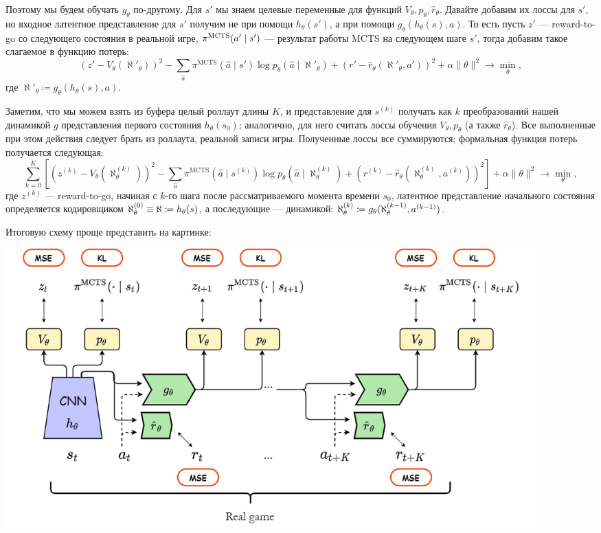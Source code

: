 Поэтому мы будем обучать $g_{\theta}$ по-другому. Для $s'$ мы знаем целевые переменные для функций $V_\theta, p_\theta, \hat{r}_\theta$. Давайте добавим их лоссы для $s'$, но входное латентное представление для $s'$ получим не при помощи $h_{\theta}(s')$, а при помощи $g_{\theta}(h_{\theta}(s), a)$. То есть пусть $z'$ --- reward-to-go со следующего состояния в реальной игре, $\pi^{\mathrm{MCTS}}(a' \HM\mid s')$ --- результат работы MCTS на следующем шаге $s'$, тогда добавим такое слагаемое в функцию потерь:
\begin{equation*}
(z' - V_\theta(\aleph'_{\theta}))^2 - \sum_{\hat{a}} \pi^{\mathrm{MCTS}}(\hat{a} \mid s') \log p_\theta(\hat{a} \mid \aleph'_{\theta}) + \left( r' - \hat{r}_{\theta}(\aleph'_{\theta}, a') \right)^2 + \alpha \| \theta \|^2 \to \min_{\theta},
\end{equation*}
где $\aleph'_{\theta} \coloneqq g_{\theta}(h_{\theta}(s), a)$.

Заметим, что мы можем взять из буфера целый роллаут длины $K$, и представление для $s^{(k)}$ получать как $k$ преобразований нашей динамикой $g$ представления первого состояния $h_{\theta}(s_0)$; аналогично, для него считать лоссы обучения $V_\theta, p_\theta$ (а также $\hat{r}_{\theta}$). Все выполненные при этом действия следует брать из роллаута, реальной записи игры. Полученные лоссы все суммируются; формальная функция потерь получается следующая:
\begin{equation}\label{muzero}
\sum_{k=0}^K \left[ (z^{(k)} - V_\theta(\aleph^{(k)}_{\theta}))^2 - \sum_{\hat{a}} \pi^{\mathrm{MCTS}}(\hat{a} \mid s^{(k)}) \log p_\theta(\hat{a} \mid \aleph^{(k)}_{\theta}) + \left( r^{(k)} - \hat{r}_{\theta}(\aleph^{(k)}_{\theta}, a^{(k)}) \right)^2 \right] + \alpha \| \theta \|^2 \to \min_{\theta},
\end{equation}
где $z^{(k)}$ --- reward-to-go, начиная с $k$-го шага после рассматриваемого момента времени $s_0$, латентное представление начального состояния определяется кодировщиком $\aleph^{(0)}_{\theta} \HM\equiv \aleph \HM\coloneqq h_{\theta}(s)$, а последующие --- динамикой: $\aleph^{(k)}_{\theta} \HM \coloneqq g_{\theta}(\aleph^{(k - 1)}_{\theta}, a^{(k-1)})$.

Итоговую схему проще представить на картинке:
\begin{center}
    \includegraphics[width=0.9\textwidth]{Images/MuZero.png}
\end{center}

